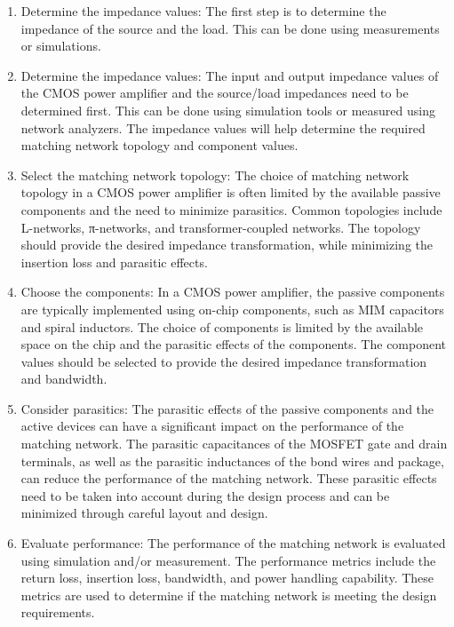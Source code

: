 \begin{enumerate}[label=\roman*. ]
\item Determine the impedance values:  The first step is to determine the impedance of the source and the load. This can be done using measurements or simulations.

\item Determine the impedance values: The input and output impedance values of the CMOS power amplifier and the source/load impedances need to be determined first. This can be done using simulation tools or measured using network analyzers. The impedance values will help determine the required matching network topology and component values.

\item Select the matching network topology: The choice of matching network topology in a CMOS power amplifier is often limited by the available passive components and the need to minimize parasitics. Common topologies include L-networks, π-networks, and transformer-coupled networks. The topology should provide the desired impedance transformation, while minimizing the insertion loss and parasitic effects.

\item Choose the components: In a CMOS power amplifier, the passive components are typically implemented using on-chip components, such as MIM capacitors and spiral inductors. The choice of components is limited by the available space on the chip and the parasitic effects of the components. The component values should be selected to provide the desired impedance transformation and bandwidth.

\item Consider parasitics: The parasitic effects of the passive components and the active devices can have a significant impact on the performance of the matching network. The parasitic capacitances of the MOSFET gate and drain terminals, as well as the parasitic inductances of the bond wires and package, can reduce the performance of the matching network. These parasitic effects need to be taken into account during the design process and can be minimized through careful layout and design.

\item Evaluate performance: The performance of the matching network is evaluated using simulation and/or measurement. The performance metrics include the return loss, insertion loss, bandwidth, and power handling capability. These metrics are used to determine if the matching network is meeting the design requirements.


\end{enumerate}
